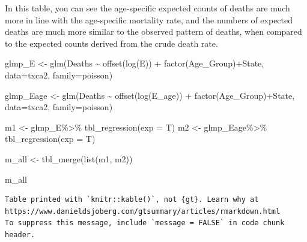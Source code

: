 \documentclass[
  letterpaper,
  DIV=11,
  numbers=noendperiod]{scrreprt}
\newenvironment{Shaded}{\begin{snugshade}}{\end{snugshade}}
\newcommand{\AttributeTok}[1]{\textcolor[rgb]{0.40,0.45,0.13}{#1}}
\newcommand{\FunctionTok}[1]{\textcolor[rgb]{0.28,0.35,0.67}{#1}}
\newcommand{\NormalTok}[1]{\textcolor[rgb]{0.00,0.23,0.31}{#1}}
\newcommand{\OtherTok}[1]{\textcolor[rgb]{0.00,0.23,0.31}{#1}}
\newcommand{\SpecialCharTok}[1]{\textcolor[rgb]{0.37,0.37,0.37}{#1}}
\begin{document}
In this table, you can see the age-specific expected counts of deaths
are much more in line with the age-specific mortality rate, and the
numbers of expected deaths are much more similar to the observed pattern
of deaths, when compared to the expected counts derived from the crude
death rate.

\begin{Shaded}
\begin{Highlighting}[]
\NormalTok{glmp\_E }\OtherTok{\textless{}{-}} \FunctionTok{glm}\NormalTok{(Deaths }\SpecialCharTok{\textasciitilde{}} \FunctionTok{offset}\NormalTok{(}\FunctionTok{log}\NormalTok{(E)) }\SpecialCharTok{+} \FunctionTok{factor}\NormalTok{(Age\_Group)}\SpecialCharTok{+}\NormalTok{State,}
              \AttributeTok{data=}\NormalTok{txca2,}
              \AttributeTok{family=}\NormalTok{poisson)}

\NormalTok{glmp\_Eage }\OtherTok{\textless{}{-}} \FunctionTok{glm}\NormalTok{(Deaths }\SpecialCharTok{\textasciitilde{}} \FunctionTok{offset}\NormalTok{(}\FunctionTok{log}\NormalTok{(E\_age)) }\SpecialCharTok{+} \FunctionTok{factor}\NormalTok{(Age\_Group)}\SpecialCharTok{+}\NormalTok{State,}
              \AttributeTok{data=}\NormalTok{txca2,}
              \AttributeTok{family=}\NormalTok{poisson)}

\NormalTok{m1 }\OtherTok{\textless{}{-}}\NormalTok{ glmp\_E}\SpecialCharTok{\%\textgreater{}\%}
  \FunctionTok{tbl\_regression}\NormalTok{(}\AttributeTok{exp =}\NormalTok{ T)}
\NormalTok{m2 }\OtherTok{\textless{}{-}}\NormalTok{ glmp\_Eage}\SpecialCharTok{\%\textgreater{}\%}
  \FunctionTok{tbl\_regression}\NormalTok{(}\AttributeTok{exp =}\NormalTok{ T)}

\NormalTok{m\_all }\OtherTok{\textless{}{-}} \FunctionTok{tbl\_merge}\NormalTok{(}\FunctionTok{list}\NormalTok{(m1, m2))}

\NormalTok{m\_all}
\end{Highlighting}
\end{Shaded}

\begin{verbatim}
Table printed with `knitr::kable()`, not {gt}. Learn why at
https://www.danieldsjoberg.com/gtsummary/articles/rmarkdown.html
To suppress this message, include `message = FALSE` in code chunk header.
\end{verbatim}
\end{document}
